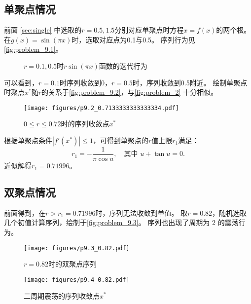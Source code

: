 \subsection{单聚点情况}
前面 \autoref{sec:single} 中选取的$r=0.5, 1.5$分别对应单聚点时方程$x=f(x)$的两个根。
在$g(x) = \sin(\pi x)$时，选取对应点为0.1与0.5。
序列行为见\autoref{fig:problem_9.1}。

\begin{figure}
    \centering
    \caption{$r=0.1, 0.5$时$r\sin(\pi x)$函数的迭代行为}
    \label{fig:problem_9.1}
\end{figure}

可以看到，$r=0.1$时序列收敛到0，$r=0.5$时，序列收敛到0.5附近。
绘制单聚点时聚点$x^*$随$r$的关系于\autoref{fig:problem_9.2}，与\autoref{fig:problem_2} 十分相似。

\begin{figure}
    \centering
    \texttt{[image: figures/p9.2\_0.7133333333333334.pdf]}
    \caption{$0\le r\le 0.72$时的序列收敛点$x^*$}
    \label{fig:problem_9.2}
\end{figure}

根据单聚点条件$|f'(x^*)| \le 1$，可得到单聚点的$r$值上限$r_1$满足：
\begin{equation}
    r_1=-\frac{1}{\pi\cos u},\quad \text{其中 }u+\tan u=0.
\end{equation}
近似解得$r_1=0.71996$。

\subsection{双聚点情况}
前面得到，在$r>r_1=0.71996$时，序列无法收敛到单值。
取$r=0.82$，随机选取几个初值计算序列，绘制于\autoref{fig:problem_9.3}。
序列也出现了周期为 2 的震荡行为。

\begin{figure}
    \begin{minipage}{0.48\textwidth}
        \centering
        \texttt{[image: figures/p9.3\_0.82.pdf]}
        \caption{$r = 0.82$时的双聚点序列}
        \label{fig:problem_9.3}
    \end{minipage}
    \hspace{2pt}
    \begin{minipage}{0.48\textwidth}
        \centering
        \texttt{[image: figures/p9.4\_0.82.pdf]}
        \caption{二周期震荡的序列收敛点$x^*$}
        \label{fig:problem_9.4}
    \end{minipage}
\end{figure}

